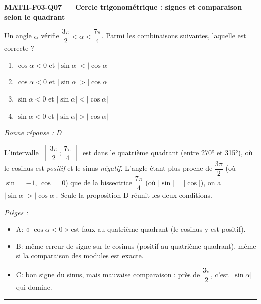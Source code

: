 \documentclass[11pt,a4paper]{article}
\begin{document}
\noindent\textbf{MATH-F03-Q07 --- Cercle trigonométrique : signes et comparaison selon le quadrant}\par
Un angle $\alpha$ vérifie $\dfrac{3\pi}{2}<\alpha<\dfrac{7\pi}{4}$. Parmi les combinaisons suivantes, laquelle est correcte ?
\begin{enumerate}[label=\Alph*)]
\item $\cos\alpha<0$ et $|\sin\alpha|<|\cos\alpha|$
\item $\cos\alpha<0$ et $|\sin\alpha|>|\cos\alpha|$
\item $\sin\alpha<0$ et $|\sin\alpha|<|\cos\alpha|$
\item $\sin\alpha<0$ et $|\sin\alpha|>|\cos\alpha|$
\end{enumerate}
\textit{Bonne réponse : D}\par
L'intervalle $\left]\dfrac{3\pi}{2}\,;\,\dfrac{7\pi}{4}\right[$ est dans le quatrième quadrant (entre \ang{270} et \ang{315}), où le cosinus est \emph{positif} et le sinus \emph{négatif}. L'angle étant plus proche de $\dfrac{3\pi}{2}$ (où $\sin=-1$, $\cos=0$) que de la bissectrice $\dfrac{7\pi}{4}$ (où $|\sin|=|\cos|$), on a $|\sin\alpha|>|\cos\alpha|$. Seule la proposition D réunit les deux conditions.\par
\textit{Pièges :}
\begin{itemize}
\item A: « $\cos\alpha<0$ » est faux au quatrième quadrant (le cosinus y est positif).
\item B: même erreur de signe sur le cosinus (positif au quatrième quadrant), même si la comparaison des modules est exacte.
\item C: bon signe du sinus, mais mauvaise comparaison : près de $\dfrac{3\pi}{2}$, c'est $|\sin\alpha|$ qui domine.
\end{itemize}
\vspace{8pt}\hrule\vspace{8pt}
\end{document}
